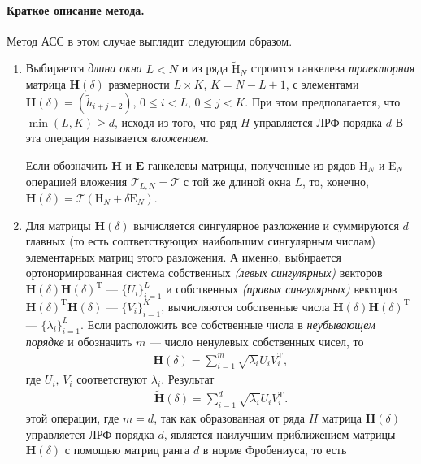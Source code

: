 \documentclass[specialist,
substylefile = spbu_report.rtx,
subf,href,colorlinks=true, 12pt]{disser}
\begin{document}
	\paragraph{Краткое описание метода.}
	Метод АСС в этом случае выглядит следующим образом.
	\begin{enumerate}
		\item
		Выбирается {\it длина окна} $L<N$ и из ряда $\widetilde{\mathrm{H}}_N$ строится ганкелева {\it траекторная} матрица $\mathbf{H}(\delta)$ размерности
		$L\times K$, $K=N-L+1$, с элементами $\mathbf{H}(\delta)=(\widetilde{h}_{i+j-2})$, $0\leqslant i<L$, $0\leqslant j<K$. При этом предполагается, что $\min(L,K)\geqslant
		d$, исходя из того, что ряд $H$ управляется ЛРФ порядка $d$
		В \cite{GNZh01} эта операция называется {\it вложением}.
		
		Если обозначить $\mathbf{H}$ и $\mathbf{E}$ ганкелевы матрицы, полученные из  рядов $\mathrm{H}_N$ и $\mathrm{E}_N$ операцией вложения $\mathcal{T}_{L, N} = \mathcal{T}$ с той же
		длиной окна $L$, то, конечно,
		${\mathbf{H}}(\delta)=\mathcal{T}(\mathrm{H}_N + \delta\mathrm{E}_N)$.
		\item
		Для матрицы $\mathbf{H}(\delta)$ вычисляется сингулярное разложение и суммируются $d$ главных (то есть соответствующих наибольшим сингулярным
		числам) элементарных матриц этого разложения. А именно, выбирается ортонормированная система собственных \emph{(левых сингулярных)} векторов $\mathbf{H}(\delta)\mathbf{H}(\delta)^\mathrm{T}$ --- $\{U_i\}_{i=1}^L$ и собственных \emph{(правых сингулярных)} векторов $\mathbf{H}(\delta)^\mathrm{T}\mathbf{H}(\delta)$ --- $\{V_i\}_{i=1}^K$, вычисляются собственные числа $\mathbf{H}(\delta)\mathbf{H}(\delta)^\mathrm{T}$ --- $\{\lambda_i\}_{i=1}^L$. Если расположить все собственные числа в \emph{неубывающем порядке} и обозначить $m$ --- число ненулевых собственных чисел, то
		\begin{gather*}
			\mathbf{H}(\delta) = \sum^m_{i=1}\sqrt{\lambda_i}U_iV_i^\mathrm{T},
		\end{gather*}
		где $U_i,\,V_i$ соответствуют $\lambda_i$. Результат
		\begin{gather*}
			\widetilde{\mathbf{H}}(\delta) = \sum^d_{i=1}\sqrt{\lambda_i}U_iV_i^\mathrm{T}.
		\end{gather*} этой операции, где $m = d$, так как образованная от ряда $H$ матрица $\mathbf{H}(\delta)$ управляется ЛРФ порядка $d$, является наилучшим приближением
		матрицы $\mathbf{H}(\delta)$ с помощью матриц ранга $d$ в норме Фробениуса, то есть
		\begin{gather*}

\end{gather*}
\end{enumerate}
\end{document}
